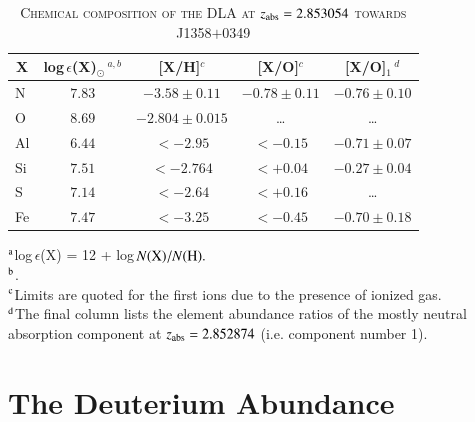 \documentclass[12pt,preprint,useAMS,usenatbib]{emulateapj}
\begin{document}
\begin{table}
\begin{center}
    \caption{\textsc{Chemical composition of the DLA at $z_{\rm abs}=2.853054$ towards J1358$+$0349}}
    \hspace{-0.6cm}\begin{tabular}{@{}lcccc}
    \hline
   \multicolumn{1}{c}{X}
& \multicolumn{1}{c}{log\,$\epsilon$(X)$_{\odot}\,^{a,b}$}
& \multicolumn{1}{c}{[X/H]$^{c}$}
& \multicolumn{1}{c}{[X/O]$^{c}$}
& \multicolumn{1}{c}{[X/O]$_{1}\,^{d}$}\\
  \hline
N  &  $7.83$  &  $-3.58\pm0.11$        &  $-0.78\pm0.11$  &  $-0.76\pm0.10$  \\
O  &  $8.69$  &  $-2.804\pm0.015$   &  \ldots                     &  \ldots  \\
Al  &  $6.44$  &  $<-2.95$       &  $<-0.15$              &  $-0.71\pm0.07$  \\
Si  &  $7.51$  &  $<-2.764$  &  $<+0.04$             &  $-0.27\pm0.04$  \\
S   &  $7.14$  &  $<-2.64$       &  $<+0.16$             &  \ldots  \\
Fe &  $7.47$  &  $<-3.25$       &  $<-0.45$              &  $-0.70\pm0.18$  \\
  \hline
    \end{tabular}
    \label{tab:abund}
\end{center}

$^{\rm a}${log\,$\epsilon$(X) = 12 + log\,$N({\rm X})/N({\rm H}).$}\\
\hspace{0.5cm}$^{\rm b}${\citet{Asp09}.}\\
\hspace{0.5cm}$^{\rm c}${Limits are quoted for the first ions due to the presence of ionized gas.}\\
\hspace{0.5cm}$^{\rm d}${The final column lists the element abundance ratios of the mostly neutral absorption component at $z_{\rm abs}=2.852874$ (i.e. component number 1).}\\
\end{table}


\section{The Deuterium Abundance}
\label{sec:dh}
\end{document}
